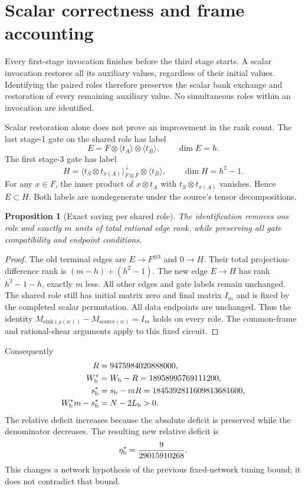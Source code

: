 \documentclass[11pt]{article}
\newtheorem{proposition}{Proposition}
\begin{document}
\section{Scalar correctness and frame accounting}
Every first-stage invocation finishes before the third stage starts. A scalar
invocation restores all its auxiliary values, regardless of their initial
values. Identifying the paired roles therefore preserves the scalar bank
exchange and restoration of every remaining auxiliary value. No simultaneous
roles within an invocation are identified.

Scalar restoration alone does not prove an improvement in the rank count.
The last stage-1 gate on the shared role has label
\[
 E=F\otimes\langle t_A\rangle\otimes\langle t_B\rangle,\qquad \dim E=h.
\]
The first stage-3 gate has label
\[
 H=\langle t_S\otimes t_{\pi(A)}\rangle^\perp_{F\otimes F}
       \otimes\langle t_B\rangle,\qquad \dim H=h^2-1.
\]
For any $x\in F$, the inner product of $x\otimes t_A$ with
$t_S\otimes t_{\pi(A)}$ vanishes. Hence $E\subset H$. Both labels are
nondegenerate under the source's tensor decompositions.

\begin{proposition}[Exact saving per shared role]
The identification removes one role and exactly $m$ units of total rational
edge rank, while preserving all gate compatibility and endpoint conditions.
\end{proposition}
\begin{proof}
The old terminal edges are $E\to F^{\otimes3}$ and $0\to H$. Their total
projection-difference rank is $(m-h)+(h^2-1)$. The new edge $E\to H$ has
rank $h^2-1-h$, exactly $m$ less. All other edges and gate labels remain
unchanged. The shared role still has initial matrix zero and final matrix
$I_m$ and is fixed by the completed scalar permutation. All data endpoints
are unchanged. Thus the identity
$M_{\mathrm{sink}(\rho(w))}-M_{\mathrm{source}(w)}=I_m$ holds on every role.
The common-frame and rational-shear arguments apply to this fixed circuit.
\end{proof}

Consequently
\begin{align*}
 R&=9475984020888000,\\
 W_{\rm b}^*&=W_{\rm b}-R=18958995769111200,\\
 s_{\rm b}^*&=s_{\rm b}-mR=1845392811609813681600,\\
 W_{\rm b}^*m-s_{\rm b}^*&=N-2L_{\rm b}>0.
\end{align*}
The relative deficit increases because the absolute deficit is preserved while
the denominator decreases. The resulting new relative deficit is
\[
 \eta_{\rm b}^*=\frac9{29015910268}.
\]
This changes a network hypothesis of the previous fixed-network tuning bound;
it does not contradict that bound.
\end{document}
